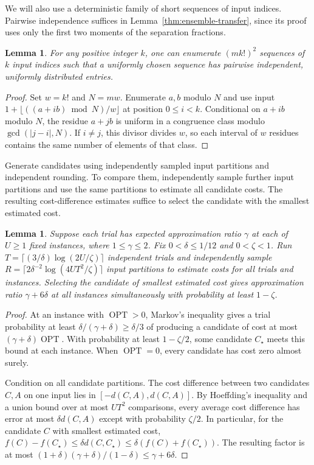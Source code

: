 \documentclass[11pt]{article}
\newtheorem{lemma}[theorem]{Lemma}
\newcommand{\OPT}{\operatorname{OPT}}
\begin{document}
We will also use a deterministic family of short sequences of input indices. Pairwise
independence suffices in Lemma~\ref{thm:ensemble-transfer}, since its
proof uses only the first two moments of the separation fractions.

\begin{lemma}\label{lem:finite-lists}
For any positive integer $k$, one can enumerate $(m k!)^2$ sequences of
$k$ input indices such that a uniformly chosen sequence has pairwise
independent, uniformly distributed entries.
\end{lemma}
\begin{proof}
Set $w=k!$ and $N=mw$. Enumerate $a,b$ modulo $N$ and use input
$1+\lfloor((a+ib)\bmod N)/w\rfloor$ at position $0\le i<k$.
Conditional on $a+ib$ modulo $N$, the residue $a+jb$ is uniform
in a congruence class modulo $\gcd(|j-i|,N)$. If $i\ne j$, this
divisor divides $w$, so each interval of $w$ residues contains the
same number of elements of that class.
\end{proof}

Generate candidates using independently sampled input partitions and
independent rounding. To compare them, independently sample further
input partitions and use the same partitions to estimate all candidate
costs. The resulting cost-difference estimates suffice to select the
candidate with the smallest estimated cost.

\begin{lemma}\label{lem:select-simple}
Suppose each trial has expected approximation ratio $\gamma$ at
each of $U\ge1$ fixed instances, where $1\le\gamma\le2$.
Fix $0<\delta\le1/12$ and $0<\zeta<1$. Run
$T=\lceil (3/\delta)\log(2U/\zeta)\rceil$ independent trials and independently
sample $R=\lceil2\delta^{-2}\log(4UT^2/\zeta)\rceil$ input partitions
to estimate costs for all trials and instances. Selecting the candidate of smallest estimated cost gives
approximation ratio $\gamma+6\delta$ at all instances simultaneously
with probability at least $1-\zeta$.
\end{lemma}
\begin{proof}
At an instance with $\OPT>0$, Markov's inequality gives a trial
probability at least $\delta/(\gamma+\delta)\ge\delta/3$ of producing
a candidate of cost at most $(\gamma+\delta)\OPT$. With probability
at least $1-\zeta/2$, some candidate $C_\star$ meets this bound at each
instance. When $\OPT=0$, every candidate has cost zero almost surely.

Condition on all candidate partitions. The cost difference between two candidates
$C,A$ on one input lies in $[-d(C,A),d(C,A)]$. By Hoeffding's inequality
and a union bound over at most $UT^2$ comparisons, every average cost
difference has error at most $\delta d(C,A)$ except with probability
$\zeta/2$. In particular, for the candidate $C$ with smallest estimated
cost, $f(C)-f(C_\star)\le\delta d(C,C_\star)\le\delta(f(C)+f(C_\star))$.
The resulting factor is at most
$(1+\delta)(\gamma+\delta)/(1-\delta)\le\gamma+6\delta$.
\end{proof}
\end{document}
